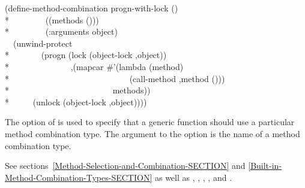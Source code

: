 \begin{defmac}
\begin{lisp}
(define-method-combination progn-with-lock () \\*
~~~~~~~~((methods ())) \\*
~~~~~~~~(:arguments object) \\
~~{\Xbq}(unwind-protect \\*
~~~~~~~(progn (lock (object-lock ,object)) \\*
~~~~~~~~~~~~~~,{\Xatsign}(mapcar \#'(lambda (method) \\*
~~~~~~~~~~~~~~~~~~~~~~~~~~~~{\Xbq}(call-method ,method ())) \\*
~~~~~~~~~~~~~~~~~~~~~~~~methods)) \\*
~~~~~(unlock (object-lock ,object))))
\end{lisp}


The  option of  is used to
specify that a generic function should use a particular method
combination type.  The argument to the 
option is the name of a method combination type.
 
See sections~\ref{Method-Selection-and-Combination-SECTION} and
\ref{Built-in-Method-Combination-Types-SECTION} as well as
,
,
,
,
and .
\end{defmac}

